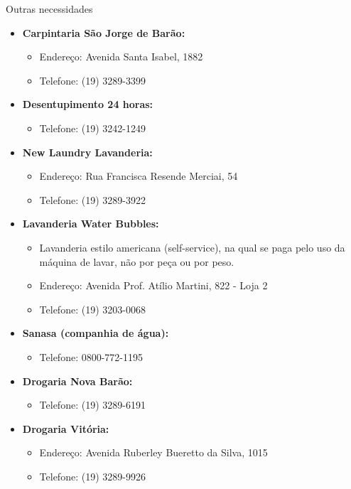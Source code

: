 \begin{story}{Outras necessidades}
\begin{itemize}
\item \textbf{Carpintaria São Jorge de Barão:}
\begin{itemize}
\item Endereço: Avenida Santa Isabel, 1882
\item Telefone: (19) 3289-3399
\end{itemize}

\item \textbf{Desentupimento 24 horas:}
\begin{itemize}
\item Telefone: (19) 3242-1249
\end{itemize}

\item \textbf{New Laundry Lavanderia:}
\begin{itemize}
\item Endereço: Rua Francisca Resende Merciai, 54
\item Telefone: (19) 3289-3922
\end{itemize}

\item \textbf{Lavanderia Water Bubbles:}
\begin{itemize}
\item Lavanderia estilo americana (self-service), na qual se paga pelo uso da máquina de lavar, não por peça ou por peso.
\item Endereço: Avenida Prof. Atílio Martini, 822 - Loja 2
\item Telefone: (19) 3203-0068
\end{itemize}

\item \textbf{Sanasa (companhia de água):}
\begin{itemize}
\item Telefone: 0800-772-1195
\end{itemize}

\item \textbf{Drogaria Nova Barão:}
\begin{itemize}
\item Telefone: (19) 3289-6191
\end{itemize}

\item \textbf{Drogaria Vitória:}
\begin{itemize}
\item Endereço: Avenida Ruberley Bueretto da Silva, 1015
\item Telefone: (19) 3289-9926
\end{itemize}


\end{itemize}
\end{story}
